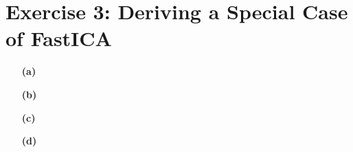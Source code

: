 \documentclass{article}
\begin{document}
\section*{Exercise 3: Deriving a Special Case of FastICA} 
\begin{itemize}
\item[\textbf{(a)}]
\item[\textbf{(b)}]
\item[\textbf{(c)}]
\item[\textbf{(d)}]
\end{itemize}
\end{document}
